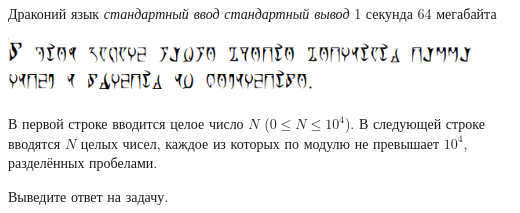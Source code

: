 \begin{problem}%
{Драконий язык}%
{\textsl{стандартный ввод}}%
{\textsl{стандартный вывод}}%
{1 секунда}%
{64 мегабайта}{}

\begin{center}
\includegraphics[scale=0.8]{images/daedric.png}
\end{center}

\InputFile

В первой строке вводится целое число $N$ ($0 \le N \le 10^4$). В следующей строке вводятся $N$ целых чисел, каждое из которых по модулю не превышает $10^4$, разделённых пробелами.

\OutputFile

Выведите ответ на задачу.

\Examples

\begin{example}
%
\end{example}
\end{problem}
